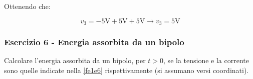 \documentclass[../main.tex]{subfiles}
\begin{document}
Ottenendo che:

\begin{equation}
	v_3 = - \text{5V} + \text{5V} + \text{5V} \rightarrow v_3 = \text{5V}
\end{equation}


\vspace*{1.5cm}
\subsubsection{Esercizio 6 - Energia assorbita da un bipolo}
\label{e1e6}


Calcolare l’energia assorbita da un bipolo, per $t > 0$, se la tensione e la corrente sono quelle indicate nella \autoref{fe1e6}  rispettivamente (si assumano versi coordinati).

\begin{figure}[h!]
\begin{center}


\end{center}
\end{figure}
\end{document}
